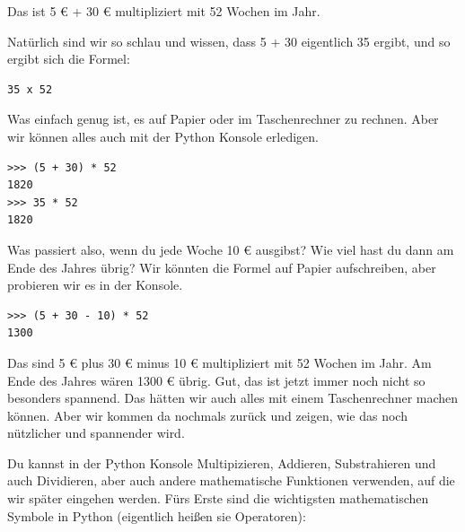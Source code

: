 Das ist 5 € + 30 € multipliziert mit 52 Wochen im Jahr. \begin{samepage}Natürlich sind wir so schlau und wissen, dass 5 + 30 eigentlich 35 ergibt, und so ergibt sich die Formel:


\begin{verbatim}
35 x 52
\end{verbatim}
\end{samepage}

Was einfach genug ist, es auf Papier oder im Taschenrechner zu rechnen. Aber wir können alles auch mit der Python Konsole erledigen.

\begin{Verbatim}[frame=single]
>>> (5 + 30) * 52
1820
>>> 35 * 52
1820
\end{Verbatim}

Was passiert also, wenn du jede Woche 10 € ausgibst? Wie viel hast du dann am Ende des Jahres übrig? Wir könnten die Formel auf Papier aufschreiben, aber probieren wir es in der Konsole.

\begin{Verbatim}[frame=single]
>>> (5 + 30 - 10) * 52
1300
\end{Verbatim}

Das sind 5 € plus 30 € minus 10 € multipliziert mit 52 Wochen im Jahr. Am Ende des Jahres wären 1300 € übrig. Gut, das ist jetzt immer noch nicht so besonders spannend. Das hätten wir auch alles mit einem Taschenrechner machen können. Aber wir kommen da nochmals zurück und zeigen, wie das noch nützlicher und spannender wird.

Du kannst in der Python Konsole Multipizieren, Addieren, Substrahieren und auch Dividieren, aber auch andere mathematische Funktionen verwenden, auf die wir später eingehen werden. Fürs Erste sind die wichtigsten mathematischen Symbole in Python (eigentlich heißen sie Operatoren):

